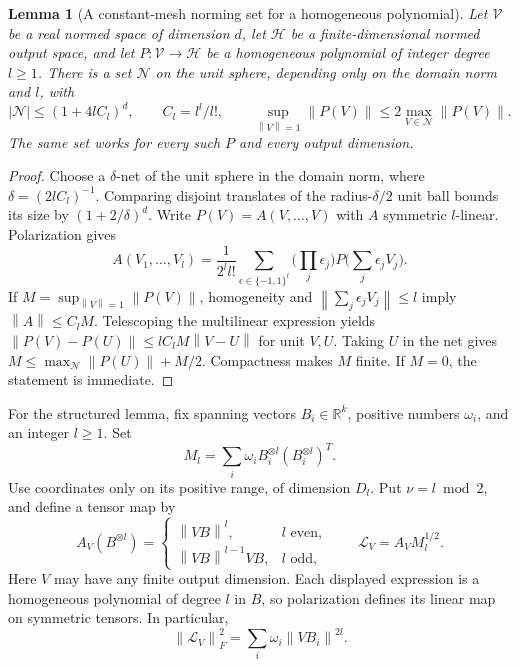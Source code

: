 \documentclass[11pt]{article}
\newtheorem{lemma}[theorem]{Lemma}
\theoremstyle{remark}\newtheorem{remark}[theorem]{Remark}
\newcommand{\R}{\mathbb R}\newcommand{\E}{\mathbb E}\newcommand{\Prob}{\mathbb P}
\newcommand{\norm}[1]{\left\|#1\right\|}\newcommand{\ip}[2]{\left\langle #1,#2\right\rangle}
\begin{document}
\begin{lemma}[A constant-mesh norming set for a homogeneous polynomial]\label{lem:polynet}
Let $\mathcal V$ be a real normed space of dimension $d$, let $\mathcal H$ be a finite-dimensional normed output space, and let $P:\mathcal V\to\mathcal H$ be a homogeneous polynomial of integer degree $l\ge1$. There is a set $\mathcal N$ on the unit sphere, depending only on the domain norm and $l$, with
\[
 |\mathcal N|\le(1+4l C_l)^d,\qquad C_l=l^l/l!,
 \qquad \sup_{\norm V=1}\norm{P(V)}\le2\max_{V\in\mathcal N}\norm{P(V)}.
\]
The same set works for every such $P$ and every output dimension.
\end{lemma}
\begin{proof}
Choose a $\delta$-net of the unit sphere in the domain norm, where $\delta=(2lC_l)^{-1}$. Comparing disjoint translates of the radius-$\delta/2$ unit ball bounds its size by $(1+2/\delta)^d$.
Write $P(V)=A(V,\ldots,V)$ with $A$ symmetric $l$-linear. Polarization gives
\[
 A(V_1,\ldots,V_l)=\frac1{2^l l!}\sum_{\epsilon\in\{-1,1\}^l}
 \Big(\prod_j\epsilon_j\Big)P\Big(\sum_j\epsilon_jV_j\Big).
\]
If $M=\sup_{\norm V=1}\norm{P(V)}$, homogeneity and $\norm{\sum_j\epsilon_jV_j}\le l$ imply $\norm A\le C_lM$. Telescoping the multilinear expression yields
$\norm{P(V)-P(U)}\le lC_lM\norm{V-U}$ for unit $V,U$.
Taking $U$ in the net gives $M\le\max_{\mathcal N}\norm{P(U)}+M/2$. Compactness makes $M$ finite. If $M=0$, the statement is immediate.
\end{proof}

For the structured lemma, fix spanning vectors $B_i\in\R^k$, positive numbers $\omega_i$, and an integer $l\ge1$. Set
\[
 M_l=\sum_i\omega_i B_i^{\otimes l}(B_i^{\otimes l})^T.
\]
Use coordinates only on its positive range, of dimension $D_l$. Put $\nu=l\bmod2$, and define a tensor map by
\[
 A_V(B^{\otimes l})=
 \begin{cases}
 \norm{VB}^{l},&l\text{ even},\\
 \norm{VB}^{l-1}VB,&l\text{ odd},
 \end{cases}
 \qquad \mathcal L_V=A_VM_l^{1/2}.
\]
Here $V$ may have any finite output dimension. Each displayed expression is a homogeneous polynomial of degree $l$ in $B$, so polarization defines its linear map on symmetric tensors. In particular,
\begin{equation}\label{eq:Lnorm}
 \norm{\mathcal L_V}_F^2=\sum_i\omega_i\norm{VB_i}^{2l}.
\end{equation}
\end{document}
